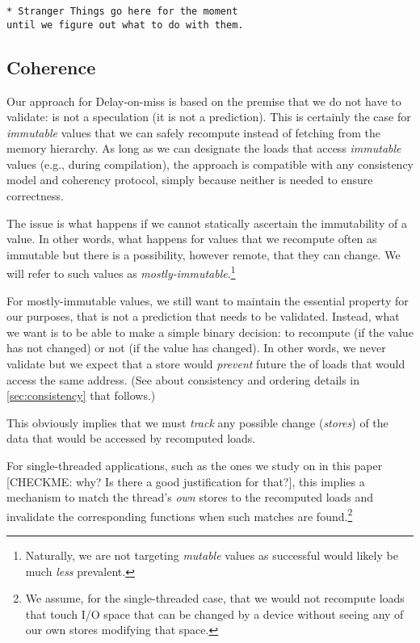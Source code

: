 \begin{verbatim}
* Stranger Things go here for the moment 
until we figure out what to do with them.
 \end{verbatim}


\subsection{Coherence}
Our \recomp approach for Delay-on-miss is based on the premise that we do not have to validate: \recomp is not a speculation (it is not a prediction). This is certainly the case for \emph{immutable} values that we can safely recompute instead of fetching from the memory hierarchy. As long as we can designate the loads that access \emph{immutable} values (e.g., during compilation), the approach is compatible with any consistency model and coherency protocol, simply because neither is needed to ensure correctness.

The issue is what happens if we cannot statically ascertain the immutability of a value. In other words, what happens for values that we recompute often as immutable but there is a possibility, however remote, that they can change. We will refer to such values as \emph{mostly-immutable}.\footnote{Naturally, we are not targeting \emph{mutable} values as successful \recomp would likely be much \emph{less} prevalent.}

For mostly-immutable values, we still want to maintain the essential property for our purposes, that \recomp is not a prediction that needs to be validated. Instead, what we want is to be able to make a simple binary decision: to recompute (if the value has not changed) or not (if the value has changed). In other words, we never validate \recomp but we expect that a store would \emph{prevent} future the \recomp of loads that would access the same address. (See about consistency and ordering details in \autoref{sec:consistency} that follows.)

This obviously implies that we must \emph{track} any possible change (\emph{stores}) of the data that would be accessed by recomputed loads.

For single-threaded applications, {\color{blue} such as the ones we study on in this paper} {\color{red} [CHECKME: why? Is there a good justification for that?]}, this implies a mechanism to match the thread's \emph{own} stores to the recomputed loads and invalidate the corresponding \recomp functions when such matches are found.\footnote{We assume, for the single-threaded case, that we would not recompute loads that touch I/O space that can be changed by a device without seeing any of our own stores modifying that space.}

